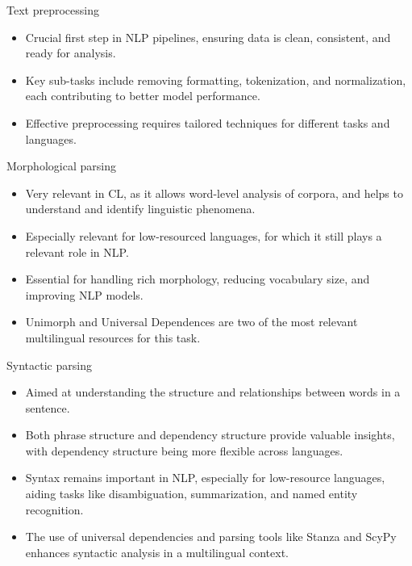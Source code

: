 \documentclass{beamer}
\begin{document}
\begin{frame}{Text preprocessing}
    \begin{itemize}
        \item Crucial first step in NLP pipelines, ensuring data is clean, consistent, and ready for analysis.
        \item Key sub-tasks include removing formatting, tokenization, and normalization, each contributing to better model performance.
        \item Effective preprocessing requires tailored techniques for different tasks and languages.
    \end{itemize}
    \vspace{1em}
\end{frame}

\begin{frame}{Morphological parsing}
    \begin{itemize}
        \item Very relevant in CL, as it allows word-level analysis of corpora, and helps to understand and identify linguistic phenomena.
        \item Especially relevant for low-resourced languages, for which it still plays a relevant role in NLP.
        \item Essential for handling rich morphology, reducing vocabulary size, and improving NLP models.
        \item Unimorph and Universal Dependences are two of the most relevant multilingual resources for this task.
    \end{itemize}
\end{frame}

\begin{frame}{Syntactic parsing}
    \begin{itemize}
        \item Aimed at understanding the structure and relationships between words in a sentence.
        \item Both phrase structure and dependency structure provide valuable insights, with dependency structure being more flexible across languages.
        \item Syntax remains important in NLP, especially for low-resource languages, aiding tasks like disambiguation, summarization, and named entity recognition.
        \item The use of universal dependencies and parsing tools like Stanza and ScyPy enhances syntactic analysis in a multilingual context.
    \end{itemize}
\end{frame}
\end{document}
